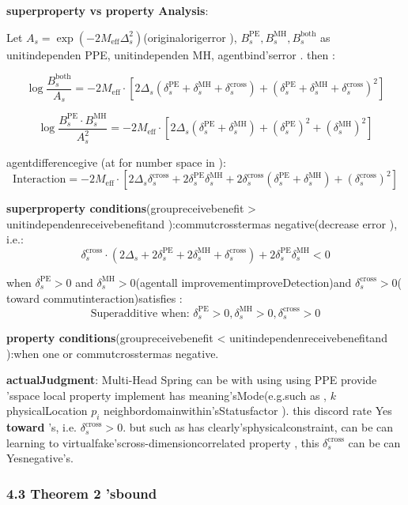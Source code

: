 \documentclass[
  12pt,
]{article}
\begin{document}
\textbf{superproperty  vs property Analysis}: 

Let
\(A_s = \exp(-2M_{\text{eff}}\Delta_s^2)\)(originalorigerror ), \(B_s^{\text{PE}}, B_s^{\text{MH}}, B_s^{\text{both}}\)
as unitindependen PPE, unitindependen MH, agentbind'serror . then : 

\[\log \frac{B_s^{\text{both}}}{A_s} = -2M_{\text{eff}} \cdot [2\Delta_s(\delta_s^{\text{PE}} + \delta_s^{\text{MH}} + \delta_s^{\text{cross}}) + (\delta_s^{\text{PE}} + \delta_s^{\text{MH}} + \delta_s^{\text{cross}})^2]\]

\[\log \frac{B_s^{\text{PE}} \cdot B_s^{\text{MH}}}{A_s^2} = -2M_{\text{eff}} \cdot [2\Delta_s(\delta_s^{\text{PE}} + \delta_s^{\text{MH}}) + (\delta_s^{\text{PE}})^2 + (\delta_s^{\text{MH}})^2]\]

agentdifferencegive (at for number space in ):
\[\text{Interaction} = -2M_{\text{eff}} \cdot [2\Delta_s \delta_s^{\text{cross}} + 2\delta_s^{\text{PE}}\delta_s^{\text{MH}} + 2\delta_s^{\text{cross}}(\delta_s^{\text{PE}} + \delta_s^{\text{MH}}) + (\delta_s^{\text{cross}})^2]\]

\textbf{superproperty conditions}(groupreceivebenefit \textgreater{}
unitindependenreceivebenefitand ):commutcrosstermas negative(decrease error ), i.e.: 
\[\delta_s^{\text{cross}} \cdot (2\Delta_s + 2\delta_s^{\text{PE}} + 2\delta_s^{\text{MH}} + \delta_s^{\text{cross}}) + 2\delta_s^{\text{PE}}\delta_s^{\text{MH}} < 0\]

when  \(\delta_s^{\text{PE}} > 0\) and 
\(\delta_s^{\text{MH}} > 0\)(agentall improvementimproveDetection)and 
\(\delta_s^{\text{cross}} > 0\)( toward commutinteraction)satisfies : 
\[\boxed{\text{Superadditive when: } \delta_s^{\text{PE}} > 0, \delta_s^{\text{MH}} > 0, \delta_s^{\text{cross}} > 0}\]

\textbf{property conditions}(groupreceivebenefit \textless{}
unitindependenreceivebenefitand ):when one or commutcrosstermas negative. 

\textbf{actualJudgment}: Multi-Head Spring can be with using using  PPE
provide 'sspace local property implement has meaning'sMode(e.g.such as ,  \(k\) physicalLocation
\(p_i\) neighbordomainwithin'sStatusfactor ). this discord rate Yes\textbf{ toward }'s, i.e.
\(\delta_s^{\text{cross}} > 0\). but such as has clearly'sphysicalconstraint, can be can learning to virtualfake'scross-dimensioncorrelated property , this
\(\delta_s^{\text{cross}}\) can be can Yesnegative's. 

\subsubsection{4.3 Theorem 2
'sbound }\label{theorem-2-ux7684ux8054ux5408ux754c}
\end{document}
